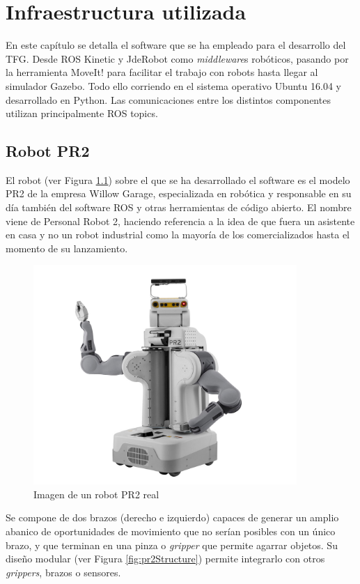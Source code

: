 \documentclass[12pt,spanish,chapterprefix, numbers=noenddot]{book}
\numberwithin{equation}{section}
\numberwithin{figure}{section}
\begin{document}
\chapter{Infraestructura utilizada}
En este capítulo se detalla el software que se ha empleado para el desarrollo del TFG. Desde ROS Kinetic y JdeRobot como \textit{middleware}s robóticos, pasando por la herramienta MoveIt! para facilitar el trabajo con robots hasta llegar al simulador Gazebo. Todo ello corriendo en el sistema operativo Ubuntu 16.04 y desarrollado en Python.  Las comunicaciones entre los distintos componentes utilizan principalmente ROS topics. 

\section{Robot PR2}
El robot (ver Figura \ref{fig:pr2}) sobre el que se ha desarrollado el software es el modelo PR2 \cite{pr2} de la empresa Willow Garage, especializada en robótica y responsable en su día también del software ROS y otras herramientas de código abierto. El nombre viene de Personal Robot 2, haciendo referencia a la idea de que fuera un asistente en casa y no un robot industrial como la mayoría de los comercializados hasta el momento de su lanzamiento. 

\begin{figure}[hbt!]
\centering
\includegraphics[width=10cm]{Figs/PR2_image.jpg}
\par
\caption{\label{fig:pr2}Imagen de un robot PR2 real}
\end{figure}

Se compone de dos brazos (derecho e izquierdo) capaces de generar un amplio abanico de oportunidades de movimiento que no serían posibles con un único brazo, y que terminan en una pinza o \textit{gripper} que permite agarrar objetos.
Su diseño modular (ver Figura \ref{fig:pr2Structure}) permite integrarlo con otros \textit{grippers}, brazos o sensores.
\end{document}
